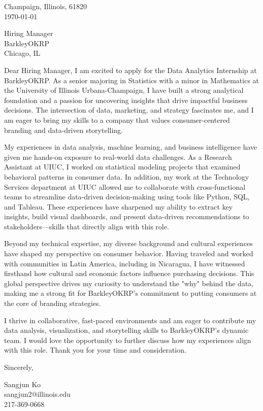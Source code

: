 \documentclass[11pt]{article}
\begin{document}
\noindent
Champaign, Illinois, 61820 \\
\today
\vspace{2em}

\noindent
Hiring Manager\\
BarkleyOKRP\\
Chicago, IL

\vspace{1.5em}

Dear Hiring Manager,
I am excited to apply for the Data Analytics Internship at BarkleyOKRP. As a senior majoring in Statistics with a minor in Mathematics at the University of Illinois Urbana-Champaign, I have built a strong analytical foundation and a passion for uncovering insights that drive impactful business decisions. The intersection of data, marketing, and strategy fascinates me, and I am eager to bring my skills to a company that values consumer-centered branding and data-driven storytelling.

My experiences in data analysis, machine learning, and business intelligence have given me hands-on exposure to real-world data challenges. As a Research Assistant at UIUC, I worked on statistical modeling projects that examined behavioral patterns in consumer data. In addition, my work at the Technology Services department at UIUC allowed me to collaborate with cross-functional teams to streamline data-driven decision-making using tools like Python, SQL, and Tableau. These experiences have sharpened my ability to extract key insights, build visual dashboards, and present data-driven recommendations to stakeholders—skills that directly align with this role.

Beyond my technical expertise, my diverse background and cultural experiences have shaped my perspective on consumer behavior. Having traveled and worked with communities in Latin America, including in Nicaragua, I have witnessed firsthand how cultural and economic factors influence purchasing decisions. This global perspective drives my curiosity to understand the "why" behind the data, making me a strong fit for BarkleyOKRP’s commitment to putting consumers at the core of branding strategies.

I thrive in collaborative, fast-paced environments and am eager to contribute my data analysis, visualization, and storytelling skills to BarkleyOKRP’s dynamic team. I would love the opportunity to further discuss how my experiences align with this role. Thank you for your time and consideration.
\vspace{1em}

Sincerely,

\vspace{2em}

\noindent
Sangjun Ko\\
sangjun2@illinois.edu\\
217-369-0668
\end{document}
